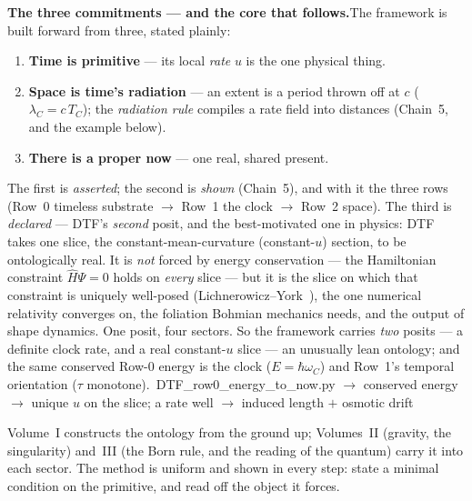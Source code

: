 \documentclass[11pt]{article}
\newcommand{\pychip}[2]{{\footnotesize\colorbox{cbPyBg}{\ttfamily\,#1\,}\,{\color{gray}$\to$ #2}}}
\begin{document}
\begin{tcolorbox}
\textbf{The three commitments --- and the core that follows.}\enspace The framework is built forward from
three, stated plainly:
\begin{enumerate}[leftmargin=1.6em,itemsep=1pt,topsep=3pt]
  \item \textbf{Time is primitive} --- its local \emph{rate} $u$ is the one physical thing.
  \item \textbf{Space is time's radiation} --- an extent is a period thrown off at $c$ ($\lambda_C=c\,T_C$);
    the \emph{radiation rule} compiles a rate field into distances (Chain~5, and the example below).
  \item \textbf{There is a proper now} --- one real, shared present.
\end{enumerate}
\noindent The first is \emph{asserted}; the second is \emph{shown} (Chain~5), and with it the three rows
(Row~0 timeless substrate $\to$ Row~1 the clock $\to$ Row~2 space). The third is \emph{declared} --- DTF's
\emph{second} posit, and the best-motivated one in physics: DTF takes one slice, the
constant-mean-curvature (constant-$u$) section, to be ontologically real. It is \emph{not} forced by energy
conservation --- the Hamiltonian constraint $\hat H\Psi=0$ holds on \emph{every} slice --- but it is the
slice on which that constraint is uniquely well-posed (Lichnerowicz--York~\cite{Lichnerowicz1944,York1972}), the one numerical relativity
converges on, the foliation Bohmian mechanics needs, and the output of shape dynamics. One posit, four
sectors. So the framework carries \emph{two} posits --- a definite clock rate, and a real constant-$u$
slice --- an unusually lean ontology; and the same conserved Row-0 energy is the clock ($E=\hbar\omega_C$)
and Row~1's temporal orientation ($\tau$ monotone).
\pychip{DTF\_row0\_energy\_to\_now.py}{conserved energy $\to$ unique $u$ on the slice; a rate well $\to$ induced length $+$ osmotic drift}
\end{tcolorbox}

\noindent Volume~I constructs the ontology from the ground up; Volumes~II (gravity, the singularity)
and~III (the Born rule, and the reading of the quantum) carry it into each sector. The method is uniform
and shown in every step: state a minimal condition on the primitive, and read off the object it forces.
\end{document}
